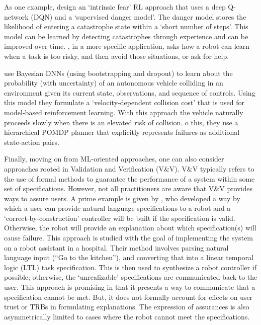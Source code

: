As one example, \citet{Lipton2016-dq} design an `intrinsic fear' RL approach that uses a deep Q-network (DQN) and a `supervised danger model'. The danger model stores the likelihood of entering a catastrophe state within a `short number of steps'. This model can be learned by detecting catastrophes through experience and can be improved over time. \citet{Curran2016-ij}, in a more specific application, asks how a robot can learn when a task is too risky, and then avoid those situations, or ask for help.

\citet{Kahn2017-vy} use Bayesian DNNs (using bootstrapping and dropout) to learn about the probability (with uncertainty) of an autonomous vehicle colliding in an environment given its current state, observations, and sequence of controls. Using this model they formulate a `velocity-dependent collision cost' that is used for model-based reinforcement learning. With this approach the vehicle naturally proceeds slowly when there is an elevated risk of collision. o this, they use a hierarchical POMDP planner that explicitly represents failures as additional state-action pairs.

Finally, moving on from ML-oriented approaches, one can also consider approaches rooted in Validation and Verification (V\&V). V\&V typically refers to the use of formal methods to guarantee the performance of a system within some set of specifications. However, not all practitioners are aware that V\&V provides ways to assure users. A prime example is given by \citet{Raman2013-mz}, who developed a way by which a user can provide natural language specifications to a robot and a `correct-by-construction' controller will be built if the specification is valid. Otherwise, the robot will provide an explanation about which specification(s) will cause failure. This approach is studied with the goal of implementing the system on a robot assistant in a hospital. Their method involves parsing natural language input (``Go to the kitchen''), and converting that into a linear temporal logic (LTL) task specification. This is then used to synthesize a robot controller if possible; otherwise, the `unrealizable' specifications are communicated back to the user. This approach is promising in that it presents a way to communicate that a specification cannot be met. But, it does not formally account for effects on user trust or TRBs in formulating explanations. The expression of assurances is also asymmetrically limited to cases where the robot cannot meet the specifications. 


